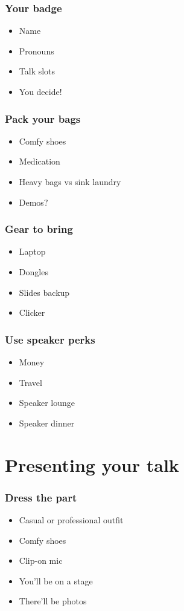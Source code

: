 \documentclass{beamer}
\begin{document}
\begin{frame}[fragile]
\frametitle{Your badge}
\begin{itemize}[<+(1)->]
\item Name
\item Pronouns
\item Talk slots
\item You decide!
\end{itemize}
\end{frame}

\begin{frame}[fragile]
\frametitle{Pack your bags}
\begin{itemize}[<+(1)->]
\item Comfy shoes
\item Medication
\item Heavy bags vs sink laundry
\item Demos$?$
\end{itemize}
\end{frame}

\begin{frame}[fragile]
\frametitle{Gear to bring}
\begin{itemize}[<+(1)->]
\item Laptop
\item Dongles
\item Slides backup
\item Clicker
\end{itemize}
\end{frame}


\begin{frame}[fragile]
\frametitle{Use speaker perks}
\begin{itemize}[<+(1)->]
\item Money
\item Travel
\item Speaker lounge
\item Speaker dinner
\end{itemize}
\end{frame}

\section{Presenting your talk}

\begin{frame}[fragile]
\tableofcontents[currentsection]
\end{frame}
\begin{frame}[fragile]
\frametitle{Dress the part}
\begin{itemize}[<+(1)->]
\item Casual or professional outfit
\item Comfy shoes
\item Clip-on mic
\item You'll be on a stage
\item There'll be photos
\end{itemize}
\end{frame}
\end{document}
